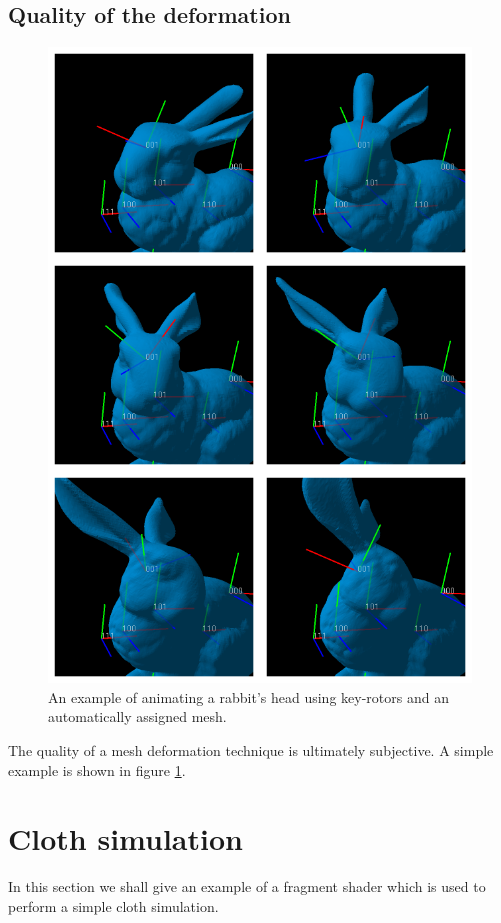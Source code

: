 \subsection{Quality of the deformation}

\begin{figure}[p]
\centering
\includegraphics[height=0.8\textheight]{mesh_example}
\caption{\label{fig:meshexample}An example of animating a rabbit's head using key-rotors and an automatically
  assigned mesh.}
\end{figure}

The quality of a mesh deformation technique is ultimately subjective. A simple example is shown
in figure \ref{fig:meshexample}.

\section{Cloth simulation}

In this section we shall give an example of a fragment shader which is used to
perform a simple cloth simulation.
